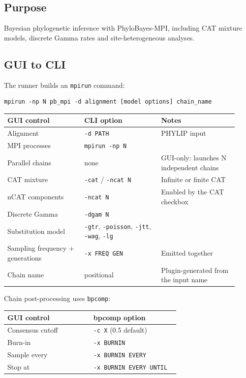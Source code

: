 \documentclass[11pt]{report}
\begin{document}
\subsection{Purpose}

Bayesian phylogenetic inference with PhyloBayes-MPI, including CAT mixture models, discrete Gamma rates and site-heterogeneous analyses.

\subsection{GUI to CLI}

The runner builds an \texttt{mpirun} command:

\begin{lstlisting}
mpirun -np N pb_mpi -d alignment [model options] chain_name
\end{lstlisting}

{\footnotesize
\begin{longtable}{@{}>{\raggedright\arraybackslash}p{0.31\linewidth}>{\raggedright\arraybackslash}p{0.31\linewidth}>{\raggedright\arraybackslash}p{0.31\linewidth}@{}}
\toprule
GUI control & CLI option & Notes \\
\midrule
\endhead
Alignment & \texttt{-d PATH} & PHYLIP input \\
MPI processes & \texttt{mpirun -np N} &  \\
Parallel chains & none & GUI-only: launches N independent chains \\
CAT mixture & \texttt{-cat} / \texttt{-ncat N} & Infinite or finite CAT \\
nCAT components & \texttt{-ncat N} & Enabled by the CAT checkbox \\
Discrete Gamma & \texttt{-dgam N} &  \\
Substitution model & \texttt{-gtr}, \texttt{-poisson}, \texttt{-jtt}, \texttt{-wag}, \texttt{-lg} &  \\
Sampling frequency + generations & \texttt{-x FREQ GEN} & Emitted together \\
Chain name & positional & Plugin-generated from the input name \\
\bottomrule
\end{longtable}
}

Chain post-processing uses \texttt{bpcomp}:

{\footnotesize
\begin{longtable}{@{}>{\raggedright\arraybackslash}p{0.47\linewidth}>{\raggedright\arraybackslash}p{0.47\linewidth}@{}}
\toprule
GUI control & bpcomp option \\
\midrule
\endhead
Consensus cutoff & \texttt{-c X} (0.5 default) \\
Burn-in & \texttt{-x BURNIN} \\
Sample every & \texttt{-x BURNIN EVERY} \\
Stop at & \texttt{-x BURNIN EVERY UNTIL} \\
\bottomrule
\end{longtable}
}
\end{document}
